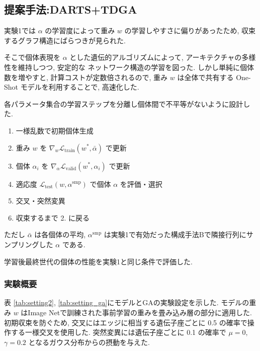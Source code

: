 \changeindent{0cm}
\subsection{提案手法:DARTS+TDGA}
\label{sec:pred.02}
\changeindent{2cm}

実験1では $\alpha$ の学習度によって重み $w$ の学習しやすさに偏りがあったため,
収束するグラフ構造にばらつきが見られた.

そこで個体表現を $\alpha$ とした遺伝的アルゴリズムによって,
アーキテクチャの多様性を維持しつつ, 安定的な
ネットワーク構造の学習を図った.
しかし単純に個体数を増やすと, 計算コストが定数倍されるので,
重み $w$ は全体で共有する One-Shot モデルを利用することで,
高速化した.

各パラメータ集合の学習ステップを分離し個体間で不平等がないように設計した.

\begin{enumerate}
  \item 一様乱数で初期個体生成
  \item 重み $w$ を $\displaystyle \nabla_w \mathcal{L}_{\mathrm{train}}(w^*, \bar{\alpha})$ で更新
  \item 個体 $\alpha_i$ を $\displaystyle \nabla_\alpha \mathcal{L}_{\mathrm{valid}}(w^*, \alpha_i)$ で更新
  \item 適応度 $\displaystyle \mathcal{L}_{\mathrm{test}}(w, \alpha^\mathrm{smp})$ で個体 $\alpha$ を評価・選択
  \item 交叉・突然変異
  \item 収束するまで 2. に戻る
\end{enumerate}
ただし
$\bar{\alpha}$ は各個体の平均,
$\alpha^\mathrm{smp}$ は実験1で有効だった構成手法Bで隣接行列にサンプリングした $\alpha$ である.

学習後最終世代の個体の性能を実験1と同じ条件で評価した.


\changeindent{0cm}
\subsubsection{実験概要}
\label{sec:pred.02_03}
\changeindent{2cm}


表 \ref{tab:setting2}, \ref{tab:setting_ga}にモデルとGAの実験設定を示した.
モデルの重み $w$ はImage Netで訓練された事前学習の重みを畳み込み層の部分に適用した.
初期収束を防ぐため, 交叉にはエッジに相当する遺伝子座ごとに 0.5 の確率で操作する一様交叉を使用した.
突然変異には遺伝子座ごとに 0.1 の確率で $\mu=0$, $\gamma=0.2$ となるガウス分布からの摂動を与えた.



